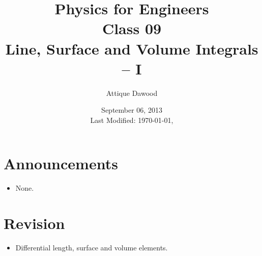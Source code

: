\documentclass[12pt,a4paper]{article}
\title{\vspace{-2cm}Physics for Engineers\\Class 09\\Line, Surface and Volume Integrals -- I}
\author{Attique Dawood}
\date{September 06, 2013\\[0.2cm] Last Modified: \today, \currenttime}
\begin{document}
\maketitle
\section{Announcements}
\begin{itemize}
\item None.
\end{itemize}
\section{Revision}
\begin{itemize}
\item Differential length, surface and volume elements.
\end{itemize}
\end{document}
